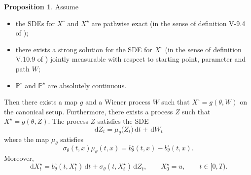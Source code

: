 \documentclass[preprint]{imsart}
\newcommand{\si}{\sigma}
\renewcommand{\th}{\theta}
\newcommand{\bb}[1]{\mathbb{#1}}
\theoremstyle{definition}
\newtheorem{prop}[thm]{Proposition}
\newcommand{\dd}{{\,\mathrm d}}
\begin{document}
\begin{prop} 
\label{prop:existence-g}
Assume 
\begin{itemize}
\item the SDEs  for $X^\circ$ and $X^\star$ are pathwise exact (in the sense of definition V-9.4 of \cite{RogersWilliams2});
\item there exists a strong solution for the SDE for $X^\circ$ (in the sense of definition V.10.9 of \cite{RogersWilliams2}) jointly measurable with respect to starting point, parameter and path $W$;
\item $\bb{P}^\circ$ and $\bb{P}^\star$ are absolutely continuous.
\end{itemize} 
Then there exists a map $g$ and a Wiener process $W$  such that $X^\circ=g(\th, W)$ on the canonical setup. Furthermore, there exists a process $Z$ such that $X^\star=g(\th, Z)$. The process $Z$ satisfies the SDE
\begin{equation}\label{eq:defZstar2} \dd Z_t = \mu_\th\big(Z_t\big) \dd t + \dd W_t \end{equation}
where the map $\mu_\th$ satisfies 
\begin{equation}\label{eq:def-mu} \si_\th(t,x)  \mu_\th(t,x) =b_\th^\star(t,x)-b_\th^\circ(t,x) .\end{equation}
Moreover,
\begin{equation}
\label{eq:relation-Zstar-Xstar} \dd X^\star_t = b^\circ_\th(t, X^\star_t) \dd t + \sigma_\th(t, X^\star_t) \dd Z_t, \qquad X^\star_0=u,\qquad t \in [0,T).
\end{equation}

\end{prop}
\end{document}
